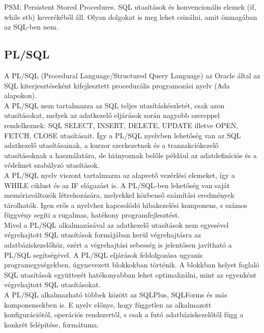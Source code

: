 \documentclass[tikz,12pt,margin=0px]{article}
\begin{document}
    \noindent PSM: Persistent Stored Procedures. SQL utasítások és konvencionális elemek (if, while stb) keverékéből áll. Olyan dolgokat is meg lehet csinálni, amit önmagában az SQL-ben nem.

 	\subsection*{PL/SQL\\}
	
    \noindent A PL/SQL (Procedural Language/Structured Query Language) az Oracle által az SQL kiterjesztéseként kifejlesztett procedurális programozási nyelv (Ada alapokon).\\

    \noindent A PL/SQL nem tartalmazza az SQL teljes utasításkészletét, csak azon utasításokat, melyek az adatkezelő eljárások során nagyobb szereppel rendelkeznek: SQL SELECT, INSERT, DELETE, UPDATE illetve OPEN, FETCH, CLOSE utasításait. Így a PL/SQL nyelvben lehetőség van az SQL adatkezelő utasításainak, a kurzor szerkezetnek és a tranzakciókezelő utasításoknak a használatára, de hiányoznak belőle például az adatdefiníciós és a védelmet szabályzó utasítások.\\

    \noindent A PL/SQL nyelv viszont tartalmazza az alapvető vezérlési elemeket, így a WHILE ciklust és az IF elágazást is. A PL/SQL-ben lehetőség van saját memóriaváltozók létrehozására, melyekkel közbenső számítási eredmények tárolhatók. Igen erős a nyelvhez kapcsolódó hibakezelési komponens, s számos függvény segíti a rugalmas, hatékony programfejlesztést.\\

    \noindent Mivel a PL/SQL alkalmazásával az adatkezelő utasítások nem egyesével végrehajtott SQL utasítások formájában kerül végrehajtásra az adatbáziskezelőhöz, ezért a végrehajtási sebesség is jelentősen javítható a PL/SQL segítségével. A PL/SQL eljárások feldolgozása ugyanis programegységekben, úgynevezett blokkokban történik. A blokkban helyet foglaló SQL utasítások együttesét hatékonyabban lehet optimalizálni, mint az egyenként végrehajtott SQL utasításokat. \\

    \noindent A PL/SQL alkalmazható többek között az SQLPlus, SQLForms és más komponensekben is. E nyelv előnye, hogy független az alkalmazott konfigurációtól, operációs rendszertől, s csak a futó adatbáziskezelőtől függ a konkrét felépítése, formátuma.\\
\end{document}
